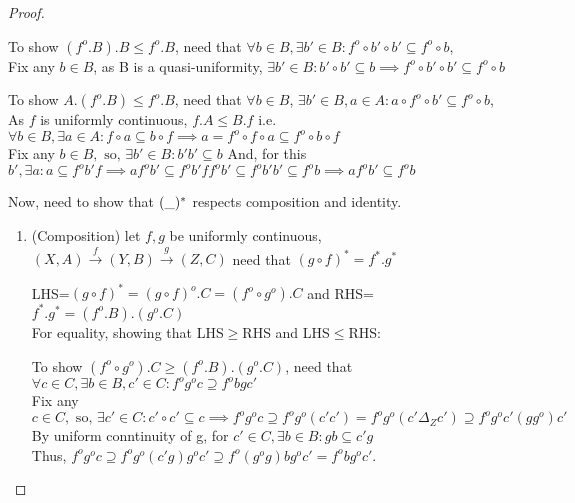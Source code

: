 \documentclass[18pt,a4paper]{article}
\theoremstyle{definition}
\begin{document}
\begin{proof}
\begin{enumerate}[label=(\roman*)]
	\end{enumerate}
\item	To show $(f^o .B).B \leq f^o .B$, need that $\forall b \in B,
	\exists b' \in B : f^o \circ b' \circ b' \subseteq f^o \circ b$,\\
	Fix any $b \in B$, as B is a quasi-uniformity, $\exists b' \in B : b' \circ b' \subseteq b
	\implies f^o \circ b'\circ b' \subseteq f^o \circ b$

	To show $A.(f^o .B) \leq f^o .B$, need that $\forall b \in B$,
	$\exists b' \in B, a\in A : a \circ f^o \circ b' \subseteq f^o \circ b$,\\
	As $f$ is uniformly continuous, $f.A\leq B.f$ i.e. $\forall b \in B, \exists a \in A
	: f \circ a \subseteq b \circ f
	\implies a= f^o \circ f \circ a \subseteq f^o \circ  b \circ f $   \\
	Fix any $b \in B, \text{ so, } \exists b' \in B : b'b' \subseteq b$
	And, for this $b', \exists a : a \subseteq f^ob'f \implies af^ob' \subseteq f^ob'ff^ob'
	\subseteq f^o b'b' \subseteq f^o b \implies af^ob' \subseteq f^o b$\\
\item	Now, need to show that $(\string _)^*$ respects composition and identity.
	\begin{enumerate}[label=(\roman*)]
		\item (Composition) let $f,g$ be uniformly continuous,
			$(X,A) \xrightarrow{f} (Y,B) \xrightarrow{g} (Z,C)$
			need that $(g \circ f)^*= f^*.g^* $

			LHS=$(g \circ f)^*=(g \circ f)^o .C=(f^o \circ g^o).C$ and
			RHS=$f^*.g^* =(f^o .B).(g^o .C)$\\
			For equality, showing that LHS$\geq$RHS and LHS$\leq$RHS:

			To show $(f^o \circ g^o).C\geq(f^o .B).(g^o .C)$, need that
			$\forall c \in C, \exists b \in B, c' \in C : f^og^oc
			\supseteq f^obgc'$ \\
			Fix any $c \in C, \text{ so, } \exists c' \in C: c' \circ c' \subseteq c
			\implies f^o g^o c \supseteq f^o g^o (c'c')
			=f^o g^o (c' \Delta_Z c') \supseteq f^o g^o c'(gg^o)c'$ \\
			By uniform conntinuity of g, for $c'\in C,\exists b\in B: gb\subseteq c'g $
			\\Thus, $f^o g^o c \supseteq f^o g^o (c'g)g^oc' \supseteq
			f^o (g^o g)bg^o c'=f^o bg^o c'$.


\end{enumerate}
\end{proof}
\end{document}
